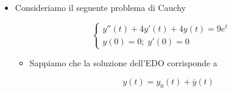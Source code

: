 \documentclass[a4paper, 12pt]{report}
\begin{document}
\begin{itemize}
\begin{itemize}
            $$ 
            \left \{ \begin{array}{l}
                0 = Ce^{0}+De^{0} + \frac{3}{5} \cdot 0 - \frac{8}{25} \\
                0 = -Ce^{0}-5De^{0}+\frac{3}{5}
            \end{array}\right .
            \quad \Longrightarrow \quad 
            \left \{ \begin{array}{l}
                0 = C+D - \frac{8}{25} \\
                0 = -C-5D+\frac{3}{5}
            \end{array}\right .
            $$
            
            $$ 
            \left \{ \begin{array}{l}
                C = -D + \frac{8}{25} \\
                0 = -(D + \frac{8}{25})-5D+\frac{3}{5}
            \end{array}\right .
            \quad \Longrightarrow \quad 
            \left \{ \begin{array}{l}
                C = \frac{1}{4} \\
                D = \frac{7}{100}
            \end{array}\right .
            $$
            
            \item L'\textbf{unica soluzione del problema}, quindi, corrisponde a:
            
            \[ y(t) = \frac{1}{4}e^{-t}+\frac{7}{100}e^{-5t} + \frac{3}{5}t - \frac{8}{25}\]
        \end{itemize}
        
        \quad
        
        \item Consideriamo il seguente problema di Cauchy
        
        $$ 
        \left \{ \begin{array}{l}
            y''(t)+4y'(t)+4y(t)=9e^{t} \\
            y(0) = 0; \; y'(0) = 0
        \end{array}\right .
        $$
        
        \begin{itemize}
            \item Sappiamo che la soluzione dell'EDO corrisponde a
            
            \[ y(t) = y_0(t) + \overline{y}(t)\]
            

\end{itemize}
\end{itemize}
\end{document}
